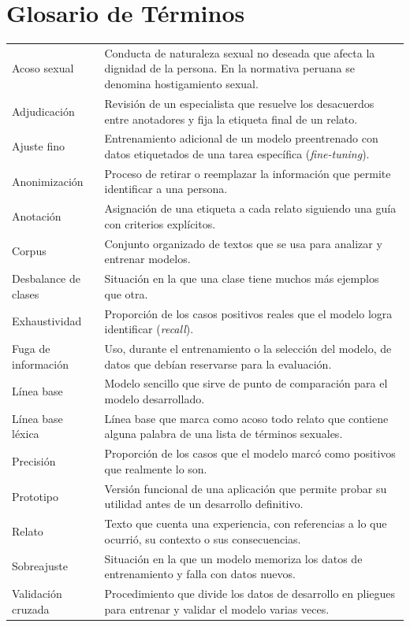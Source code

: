 \chapter*{Glosario de Términos}

\begin{singlespace}
\renewcommand{\arraystretch}{1.3}
\begin{longtable}{@{}L{4cm} L{11.4cm}@{}}
Acoso sexual & Conducta de naturaleza sexual no deseada que afecta la dignidad de la persona. En la normativa peruana se denomina hostigamiento sexual. \\
Adjudicación & Revisión de un especialista que resuelve los desacuerdos entre anotadores y fija la etiqueta final de un relato. \\
Ajuste fino & Entrenamiento adicional de un modelo preentrenado con datos etiquetados de una tarea específica (\textit{fine-tuning}). \\
Anonimización & Proceso de retirar o reemplazar la información que permite identificar a una persona. \\
Anotación & Asignación de una etiqueta a cada relato siguiendo una guía con criterios explícitos. \\
Corpus & Conjunto organizado de textos que se usa para analizar y entrenar modelos. \\
Desbalance de clases & Situación en la que una clase tiene muchos más ejemplos que otra. \\
Exhaustividad & Proporción de los casos positivos reales que el modelo logra identificar (\textit{recall}). \\
Fuga de información & Uso, durante el entrenamiento o la selección del modelo, de datos que debían reservarse para la evaluación. \\
Línea base & Modelo sencillo que sirve de punto de comparación para el modelo desarrollado. \\
Línea base léxica & Línea base que marca como acoso todo relato que contiene alguna palabra de una lista de términos sexuales. \\
Precisión & Proporción de los casos que el modelo marcó como positivos que realmente lo son. \\
Prototipo & Versión funcional de una aplicación que permite probar su utilidad antes de un desarrollo definitivo. \\
Relato & Texto que cuenta una experiencia, con referencias a lo que ocurrió, su contexto o sus consecuencias. \\
Sobreajuste & Situación en la que un modelo memoriza los datos de entrenamiento y falla con datos nuevos. \\
Validación cruzada & Procedimiento que divide los datos de desarrollo en pliegues para entrenar y validar el modelo varias veces. \\
\end{longtable}
\end{singlespace}
\setcounter{table}{0}
